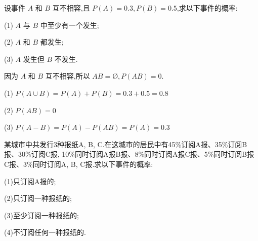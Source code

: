 \question 设事件 $A$ 和 $B$ 互不相容,且 $P(A)=0.3, P(B)=0.5$,求以下事件的概率:

(1) $A$ 与 $B$ 中至少有一个发生;

(2) $A$ 和 $B$ 都发生;

(3) $A$ 发生但 $B$ 不发生.

\begin{solution}
    因为 $A$ 和 $B$ 互不相容,所以 $AB = \text{\O}, P(AB)=0$.

    (1) $P(A \cup B) = P(A) + P(B) = 0.3+0.5 = 0.8$

    (2) $P(AB) = 0$

    (3) $P(A-B) = P(A) - P(AB) = P(A) = 0.3$
\end{solution}

\question 某城市中共发行3种报纸A, B, C.在这城市的居民中有45\%订阅A报、35\%订阅B报、30\%订阅C报, 10\%同时订阅A报B报、8\%同时订阅A报C报、5\%同时订阅B报C报、3\%同时订阅A, B, C报.求以下事件的概率:

(1)只订阅A报的;

(2)只订阅一种报纸的;

(3)至少订阅一种报纸的;

(4)不订阅任何一种报纸的.

